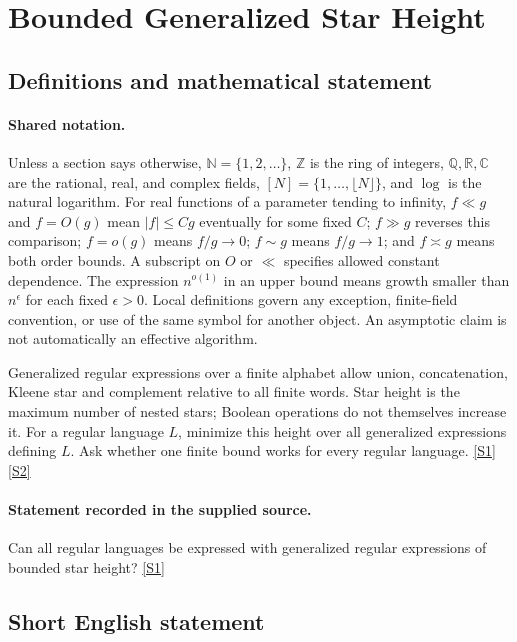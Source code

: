 \documentclass[11pt,a4paper]{article}
\newcommand{\N}{\mathbb{N}}
\newcommand{\Z}{\mathbb{Z}}
\newcommand{\Q}{\mathbb{Q}}
\newcommand{\R}{\mathbb{R}}
\newcommand{\C}{\mathbb{C}}
\newcommand{\sref}[2]{\hyperlink{source:#1:#2}{[S#2]}}
\begin{document}
\section{Bounded Generalized Star Height}\label{statement}


\subsection{Definitions and mathematical statement}

\paragraph{Shared notation.}Unless a section says otherwise, $\N=\{1,2,\ldots\}$,
$\Z$ is the ring of integers, $\Q,\R,\C$ are the rational, real, and complex
fields, $[N]=\{1,\ldots,\lfloor N\rfloor\}$, and $\log$ is the natural
logarithm. For real functions of a parameter tending to infinity,
$f\ll g$ and $f=O(g)$ mean $|f|\leq Cg$ eventually for some fixed $C$;
$f\gg g$ reverses this comparison; $f=o(g)$ means $f/g\to0$;
$f\sim g$ means $f/g\to1$; and $f\asymp g$ means both order bounds.
A subscript on $O$ or $\ll$ specifies allowed constant dependence.
The expression $n^{o(1)}$ in an upper bound means growth smaller than
$n^\epsilon$ for each fixed $\epsilon>0$. Local definitions govern any
exception, finite-field convention, or use of the same symbol for another
object. An asymptotic claim is not automatically an effective algorithm.



Generalized regular expressions over a finite alphabet allow union, concatenation, Kleene star and complement relative to all finite words. Star height is the maximum number of nested stars; Boolean operations do not themselves increase it. For a regular language $L$, minimize this height over all generalized expressions defining $L$. Ask whether one finite bound works for every regular language. \sref{statement}{1} \sref{statement}{2}

\paragraph{Statement recorded in the supplied source.}
Can all regular languages be expressed with generalized regular expressions of bounded star height? \sref{statement}{1}

\subsection{Short English statement}
\end{document}
